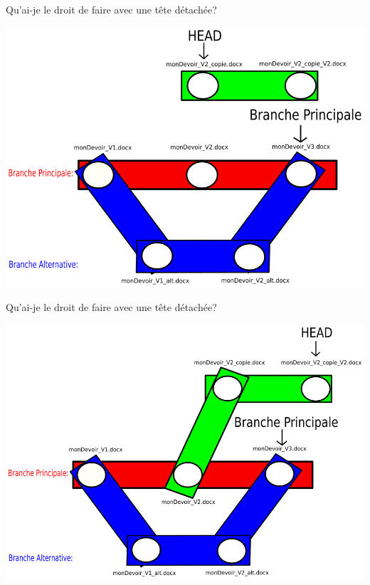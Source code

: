 \documentclass{beamer}
\begin{document}
\begin{frame}{Qu'ai-je le droit de faire avec une tête détachée?}
    \begin{center}
        \includegraphics[scale=0.35]{images/detachedHead/detachedHead2.png}
    \end{center}
\end{frame}

\begin{frame}{Qu'ai-je le droit de faire avec une tête détachée?}
    \begin{center}
        \includegraphics[scale=0.35]{images/detachedHead/detachedHead3.png}
    \end{center}
\end{frame}
\end{document}
